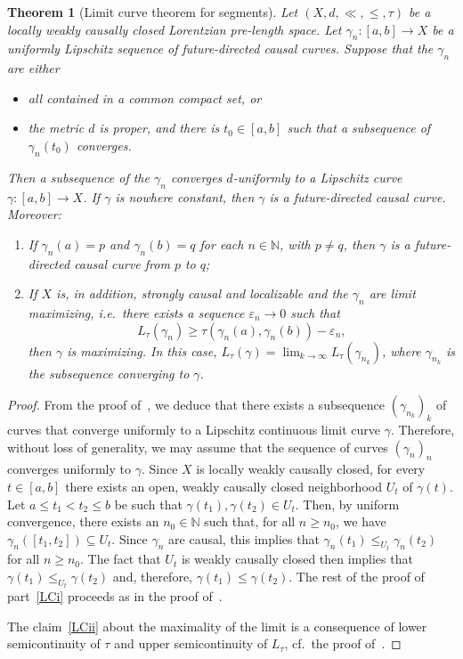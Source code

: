 \documentclass[a4paper,11pt]{article}
\numberwithin{equation}{section}
\theoremstyle{plain}
\newtheorem{Theorem}[Definition]{Theorem}
\theoremstyle{definition}
\newcommand{\N}{\mathbb N}
\begin{document}
\begin{Theorem}[Limit curve theorem for segments]
\label{Theorem: limitcurvetheoremforsegments}
Let $(X,d,\ll,\leq,\tau)$ be a 
locally weakly causally closed Lorentzian pre-length space. Let $\gamma_n \colon [a, b] \to X$ be a uniformly Lipschitz sequence of future-directed causal curves. Suppose that the $\gamma_n$ are either
\begin{itemize}
    \item[(a)] all contained in a common compact set, or 
    \item[(b)] the metric $d$ is proper, and there is $t_0 \in [a, b]$ such that a subsequence of $\gamma_n(t_0)$ converges. 
\end{itemize}
Then a subsequence of the $\gamma_n$ converges $d$-uniformly to a Lipschitz curve $\gamma \colon [a, b] \to X$. If $\gamma$ is nowhere constant, then $\gamma$ is a future-directed causal curve. Moreover:
\begin{enumerate}
\item\label{LCi} If $\gamma_n(a) = p$ and $\gamma_n(b) = q$ for each $n \in \N$, with $p \neq q$, then $\gamma$ is a future-directed causal curve from $p$ to $q$; 
\item\label{LCii} If $X$ is, in addition, strongly causal and localizable and the $\gamma_n$ are limit maximizing, i.e.\ there exists a sequence $\varepsilon_n \to 0$ such that
\[
L_{\tau}(\gamma_n) \geq \tau(\gamma_n(a),\gamma_n(b)) - \varepsilon_n,
\]
then $\gamma$ is maximizing. In this case, $L_{\tau}(\gamma) = \lim_{k \to \infty} L_{\tau}(\gamma_{n_k})$, where $\gamma_{n_k}$ is the subsequence converging to $\gamma$.
\end{enumerate}
\end{Theorem}
\begin{proof}
From the proof of~\cite[Thm.~3.7]{kunzinger2018lorentzian}, we deduce that there exists a subsequence $\left( \gamma_{n_k} \right)_k$ of curves that converge uniformly to a Lipschitz continuous limit curve $\gamma$. Therefore, without loss of generality, we may assume that the sequence of curves $\left( \gamma_n \right)_n$ converges uniformly to $\gamma$. Since $X$ is locally weakly causally closed, for every $t \in [a, b]$ there exists an open, weakly causally closed neighborhood $U_t$ of $\gamma(t)$. Let $a \le t_1 < t_2 \le b$ be such that $\gamma(t_1), \gamma(t_2) \in U_t$. Then, by uniform convergence, there exists an $n_0 \in \N$ such that, for all $n \ge n_0$, we have $\gamma_n \!\left( \left[ t_1, t_2 \right] \right) \subseteq U_t$. Since $\gamma_n$ are causal, this implies that $\gamma_n(t_1) \le_{U_t} \gamma_n(t_2)$ for all $n \ge n_0$. The fact that $U_t$ is weakly causally closed then implies that $\gamma(t_1) \le_{U_t} \gamma(t_2)$ and, therefore, $\gamma(t_1) \le \gamma(t_2)$. The rest of the proof of part~\ref{LCi} proceeds as in the proof of~\cite[Lemma~3.6]{kunzinger2018lorentzian}. 


The claim~\ref{LCii} about the maximality of the limit is a consequence of lower semicontinuity of $\tau$ and upper semicontinuity of $L_{\tau}$, 
cf.\ the proof of~\cite[Thm.\ 2.23]{beran2023splitting}.
\end{proof}
\end{document}
